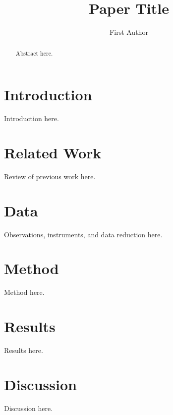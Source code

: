 \documentclass[onecolumn]{openjournal}
\begin{document}
\title{Paper Title}

\author{First Author}

\begin{abstract}
Abstract here.
\end{abstract}


\maketitle

\section{Introduction}
\label{sec:intro}
Introduction here.

\section{Related Work}
\label{sec:related_work}
Review of previous work here.

\section{Data}
\label{sec:data}
Observations, instruments, and data reduction here.

\section{Method}
\label{sec:method}
Method here.

\section{Results}
\label{sec:results}
Results here.

\section{Discussion}
\label{sec:discussion}
Discussion here.
\end{document}
